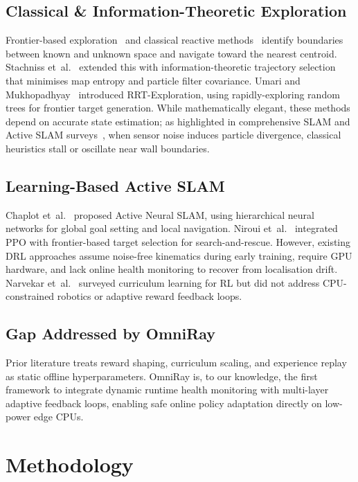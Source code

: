 \documentclass[conference]{IEEEtran}
\begin{document}
\subsection{Classical \& Information-Theoretic Exploration}
Frontier-based exploration~\cite{yamauchi1997} and classical reactive methods~\cite{borenstein1991} identify boundaries between known and unknown space and navigate toward the nearest centroid.
Stachniss et~al.~\cite{stachniss2005} extended this with information-theoretic trajectory selection that minimises map entropy and particle filter covariance.
Umari and Mukhopadhyay~\cite{umari2017} introduced RRT-Exploration, using rapidly-exploring random trees for frontier target generation.
While mathematically elegant, these methods depend on accurate state estimation; as highlighted in comprehensive SLAM and Active SLAM surveys~\cite{cadena2016,placed2023}, when sensor noise induces particle divergence, classical heuristics stall or oscillate near wall boundaries.

\subsection{Learning-Based Active SLAM}
Chaplot et~al.~\cite{chaplot2020} proposed Active Neural SLAM, using hierarchical neural networks for global goal setting and local navigation.
Niroui et~al.~\cite{niroui2019} integrated PPO with frontier-based target selection for search-and-rescue.
However, existing DRL approaches assume noise-free kinematics during early training, require GPU hardware, and lack online health monitoring to recover from localisation drift.
Narvekar et~al.~\cite{narvekar2020} surveyed curriculum learning for RL but did not address CPU-constrained robotics or adaptive reward feedback loops.

\subsection{Gap Addressed by OmniRay}
Prior literature treats reward shaping, curriculum scaling, and experience replay as static offline hyperparameters.
OmniRay is, to our knowledge, the first framework to integrate dynamic runtime health monitoring with multi-layer adaptive feedback loops, enabling safe online policy adaptation directly on low-power edge CPUs.

\section{Methodology}
\end{document}
